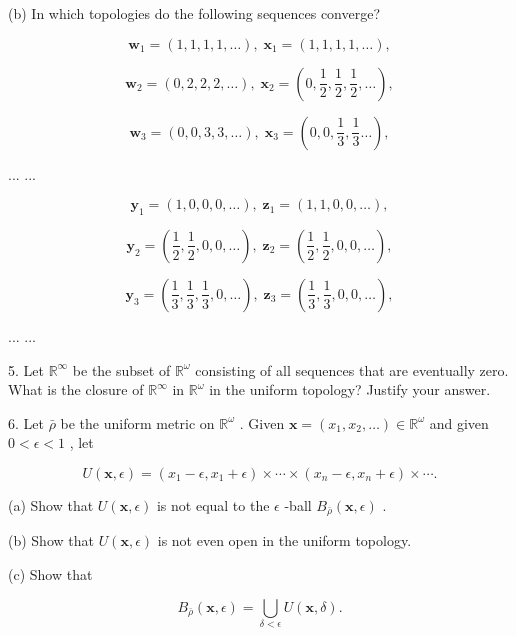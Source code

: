 (b) In which topologies do the following sequences converge?

\[
{\mathbf{w}}_{1} = \left( {1,1,1,1,\ldots }\right) ,\;{\mathbf{x}}_{1} = \left( {1,1,1,1,\ldots }\right) ,
\]

\[
{\mathbf{w}}_{2} = \left( {0,2,2,2,\ldots }\right) ,\;{\mathbf{x}}_{2} = \left( {0,\frac{1}{2},\frac{1}{2},\frac{1}{2},\ldots }\right) ,
\]

\[
{\mathbf{w}}_{3} = \left( {0,0,3,3,\ldots }\right) ,\;{\mathbf{x}}_{3} = \left( {0,0,\frac{1}{3},\frac{1}{3}\ldots }\right) ,
\]

... ...

\[
{\mathbf{y}}_{1} = \left( {1,0,0,0,\ldots }\right) ,\;{\mathbf{z}}_{1} = \left( {1,1,0,0,\ldots }\right) ,
\]

\[
{\mathbf{y}}_{2} = \left( {\frac{1}{2},\frac{1}{2},0,0,\ldots }\right) ,\;{\mathbf{z}}_{2} = \left( {\frac{1}{2},\frac{1}{2},0,0,\ldots }\right) ,
\]

\[
{\mathbf{y}}_{3} = \left( {\frac{1}{3},\frac{1}{3},\frac{1}{3},0,\ldots }\right) ,\;{\mathbf{z}}_{3} = \left( {\frac{1}{3},\frac{1}{3},0,0,\ldots }\right) ,
\]

... ...

5. Let \({\mathbb{R}}^{\infty }\) be the subset of \({\mathbb{R}}^{\omega }\) consisting of all sequences that are eventually zero. What is the closure of \({\mathbb{R}}^{\infty }\) in \({\mathbb{R}}^{\omega }\) in the uniform topology? Justify your answer.

6. Let \(\bar{\rho }\) be the uniform metric on \({\mathbb{R}}^{\omega }\) . Given \(\mathbf{x} = \left( {{x}_{1},{x}_{2},\ldots }\right)  \in  {\mathbb{R}}^{\omega }\) and given \(0 < \epsilon  < 1\) , let

\[
U\left( {\mathbf{x},\epsilon }\right)  = \left( {{x}_{1} - \epsilon ,{x}_{1} + \epsilon }\right)  \times  \cdots  \times  \left( {{x}_{n} - \epsilon ,{x}_{n} + \epsilon }\right)  \times  \cdots .
\]

(a) Show that \(U\left( {\mathbf{x},\epsilon }\right)\) is not equal to the \(\epsilon\) -ball \({B}_{\bar{\rho }}\left( {\mathbf{x},\epsilon }\right)\) .

(b) Show that \(U\left( {\mathbf{x},\epsilon }\right)\) is not even open in the uniform topology.

(c) Show that

\[
{B}_{\bar{\rho }}\left( {\mathbf{x},\epsilon }\right)  = \mathop{\bigcup }\limits_{{\delta  < \epsilon }}U\left( {\mathbf{x},\delta }\right) .
\]

